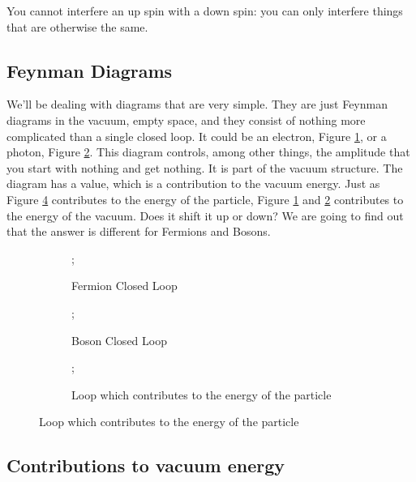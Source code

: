 \documentclass[]{article}
\begin{document}
You cannot interfere an up spin with a down spin: you can only interfere things that are otherwise the same.

\subsection{Feynman Diagrams}

We'll be dealing with diagrams that are very simple. They are just Feynman diagrams in the vacuum, empty space, and they consist of nothing more complicated than a single closed loop. It could be an electron, Figure \ref{fig:particles3-2-loops}, or a photon, Figure \ref{fig:particles3-2-loops-boson}. This diagram controls, among other things, the amplitude that you start with nothing and get nothing. It is part of the vacuum structure. The diagram has a  value, which is a contribution to the vacuum energy. Just as Figure \ref{fig:particles3-2-loops-p} contributes to the energy of the particle, Figure \ref{fig:particles3-2-loops} and \ref{fig:particles3-2-loops-boson} contributes to the energy of the vacuum. Does it shift it up or down? We are going to find out that the answer is different for Fermions and Bosons.


\begin{figure}[H]
	\caption{A few Feynman diagrams}
	\begin{subfigure}[t]{0.3\textwidth}
		\caption{Fermion Closed Loop}\label{fig:particles3-2-loops}
		;
	\end{subfigure}
	\hfill
	\begin{subfigure}[t]{0.3\textwidth}
		\caption{Boson Closed Loop}\label{fig:particles3-2-loops-boson}
		;
	\end{subfigure}
	\hfill
	\begin{subfigure}[t]{0.3\textwidth}
		\caption{Loop which contributes to the energy of the particle}\label{fig:particles3-2-loops-p}
		;
	\end{subfigure}
\end{figure}

\subsection{Contributions to vacuum energy}
\end{document}
